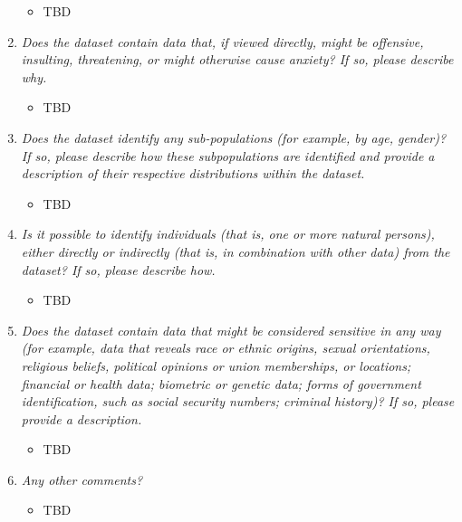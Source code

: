 \documentclass[
  letterpaper,
  DIV=11,
  numbers=noendperiod]{scrartcl}
\providecommand{\tightlist}{%
  \setlength{\itemsep}{0pt}\setlength{\parskip}{0pt}}\usepackage{longtable,booktabs,array}
\begin{document}
\begin{enumerate}
  \begin{itemize}
  \tightlist
  \item
    TBD
  \end{itemize}
\item
  \emph{Does the dataset contain data that, if viewed directly, might be
  offensive, insulting, threatening, or might otherwise cause anxiety?
  If so, please describe why.}

  \begin{itemize}
  \tightlist
  \item
    TBD
  \end{itemize}
\item
  \emph{Does the dataset identify any sub-populations (for example, by
  age, gender)? If so, please describe how these subpopulations are
  identified and provide a description of their respective distributions
  within the dataset.}

  \begin{itemize}
  \tightlist
  \item
    TBD
  \end{itemize}
\item
  \emph{Is it possible to identify individuals (that is, one or more
  natural persons), either directly or indirectly (that is, in
  combination with other data) from the dataset? If so, please describe
  how.}

  \begin{itemize}
  \tightlist
  \item
    TBD
  \end{itemize}
\item
  \emph{Does the dataset contain data that might be considered sensitive
  in any way (for example, data that reveals race or ethnic origins,
  sexual orientations, religious beliefs, political opinions or union
  memberships, or locations; financial or health data; biometric or
  genetic data; forms of government identification, such as social
  security numbers; criminal history)? If so, please provide a
  description.}

  \begin{itemize}
  \tightlist
  \item
    TBD
  \end{itemize}
\item
  \emph{Any other comments?}

  \begin{itemize}
  \tightlist
  \item
    TBD
  \end{itemize}
\end{enumerate}
\end{document}
